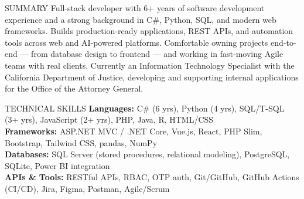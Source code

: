 \documentclass{resume}
\begin{document}

\begin{rSection}{SUMMARY}
Full-stack developer with 6+ years of software development experience and a strong background in C\#, Python, SQL, and modern web frameworks. Builds production-ready applications, REST APIs, and automation tools across web and AI-powered platforms. Comfortable owning projects end-to-end --- from database design to frontend --- and working in fast-moving Agile teams with real clients. Currently an Information Technology Specialist with the California Department of Justice, developing and supporting internal applications for the Office of the Attorney General.
\end{rSection}


\begin{rSection}{TECHNICAL SKILLS}
\textbf{Languages:} C\# (6 yrs), Python (4 yrs), SQL/T-SQL (3+ yrs), JavaScript (2+ yrs), PHP, Java, R, HTML/CSS \\
\textbf{Frameworks:} ASP.NET MVC / .NET Core, Vue.js, React, PHP Slim, Bootstrap, Tailwind CSS, pandas, NumPy \\
\textbf{Databases:} SQL Server (stored procedures, relational modeling), PostgreSQL, SQLite, Power BI integration \\
\textbf{APIs \& Tools:} RESTful APIs, RBAC, OTP auth, Git/GitHub, GitHub Actions (CI/CD), Jira, Figma, Postman, Agile/Scrum
\end{rSection}

\end{document}
